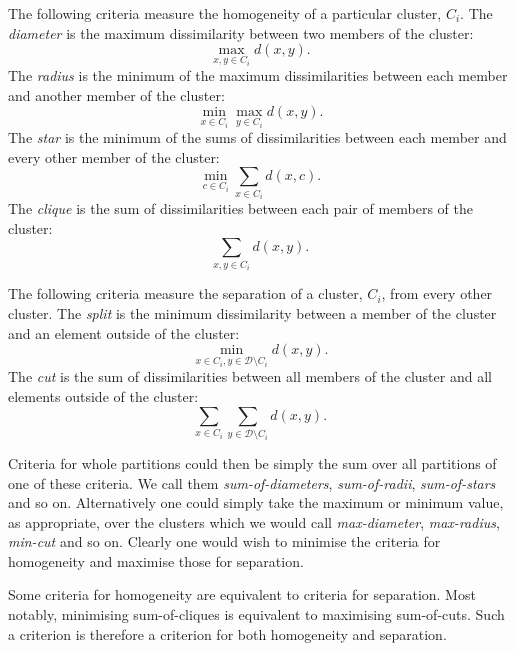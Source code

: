 \documentclass[a4paper]{report}
\newcommand{\dset}{\mathcal{D}}
\begin{document}
The following criteria measure the homogeneity of a particular cluster, $C_i$.
The \textit{diameter} is the maximum dissimilarity between two members of the
cluster:
\begin{equation*}
  \max_{x,y \in C_i} d(x,y).
\end{equation*}
The \textit{radius} is the minimum of the maximum dissimilarities between each
member and another member of the cluster:
\begin{equation*}
  \min_{x \in C_i} \max_{y \in C_i} d(x,y).
\end{equation*}
The \textit{star} is the minimum of the sums of dissimilarities between each
member and every other member of the cluster:
\begin{equation*}
  \min_{c \in C_i} \sum_{x \in C_i} d(x,c).
\end{equation*}
The \textit{clique} is the sum of dissimilarities between each pair of members
of the cluster:
\begin{equation*}
  \sum_{x,y \in C_i} d(x,y).
\end{equation*}

The following criteria measure the separation of a cluster, $C_i$, from every
other cluster.  The \textit{split} is the minimum dissimilarity between a
member of the cluster and an element outside of the cluster:
\begin{equation*}
  \min_{x \in C_i, y \in \dset \setminus C_i} d(x,y).
\end{equation*}
The \textit{cut} is the sum of dissimilarities between all members of the
cluster and all elements outside of the cluster:
\begin{equation*}
  \sum_{x \in C_i} \sum_{y \in \dset \setminus C_i} d(x,y).
\end{equation*}

Criteria for whole partitions could then be simply the sum over all partitions
of one of these criteria.  We call them \textit{sum-of-diameters},
\textit{sum-of-radii}, \textit{sum-of-stars} and so on.  Alternatively one
could simply take the maximum or minimum value, as appropriate, over the
clusters which we would call \textit{max-diameter}, \textit{max-radius},
\textit{min-cut} and so on.  Clearly one would wish to minimise the criteria
for homogeneity and maximise those for separation.

Some criteria for homogeneity are equivalent to criteria for separation.  Most
notably, minimising sum-of-cliques is equivalent to maximising sum-of-cuts.
Such a criterion is therefore a criterion for both homogeneity and separation.
\end{document}
